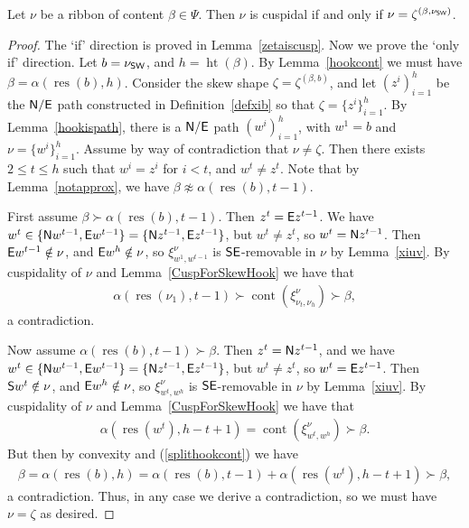 \documentclass[Unicode,ALCO]{cedram}
\newcommand{\res}{\operatorname{res}}
\newcommand{\height}{\operatorname{ht}}
\newcommand{\0}{{\bar 0}}
\newcommand{\so}{{\sf S}}
\newcommand{\no}{{\sf N}}
\newcommand{\ea}{{\sf E}}
\newcommand{\ssee}{{\sf SE}}
\newcommand{\ssww}{{\sf SW}}
\def\cont{{\operatorname{cont}}}
\def\height{{\operatorname{ht}}}
\def\height{{\operatorname{ht}}}
\begin{document}
\begin{lemma}\label{onlycuspribbon}
Let \(\nu\) be a ribbon of content \(\beta \in \Psi\). Then \(\nu\) is cuspidal if and only if \(\nu = \zeta^{(\beta, \nu_{\ssww})}\).
\end{lemma}
\begin{proof}
The `if' direction is proved in Lemma~\ref{zetaiscusp}. Now we prove the `only if' direction. Let \(b =\nu_{\ssww}\), and \(h = \height(\beta)\). By Lemma~\ref{hookcont} we must have \(\beta = \alpha(\res(b),h)\). Consider the skew shape \(\zeta = \zeta^{(\beta,b)}\), and let \((z^i)_{i=1}^h\) be the \(\no/\ea\) path constructed in Definition~\ref{defxib} so that \(\zeta = \{z^i\}_{i=1}^h\). By Lemma~\ref{hookispath}, there is a \(\no/\ea\) path \((w^i)_{i=1}^h\), with \(w^1 = b\) and \(\nu = \{w^i\}_{i=1}^h\). Assume by way of contradiction that \(\nu \neq \zeta\). Then there exists \(2 \leq t \leq h\) such that \(w^i = z^i\) for \(i<t\), and \(w^t \neq z^t\). Note that by Lemma~\ref{notapprox}, we have \(\beta \not \approx \alpha(\res(b),t-1)\).

First assume \(\beta \succ \alpha(\res(b),t-1)\). Then \(z^t = \ea z^{t-1}\).
We have \(w^t \in \{\no w^{t-1}, \ea w^{t-1}\} = \{\no z^{t-1}, \ea z^{t-1}\}\), but \(w^t \neq z^t\), so \(w^t = \no z^{t-1}\). Then \(\ea w^{t-1} \notin \nu\), and \(\ea w^h \notin \nu\), so \(\xi^\nu_{w^1, w^{t-1}}\) is \(\ssee\)-removable in \(\nu\) by Lemma~\ref{xiuv}. By cuspidality of \(\nu\) and Lemma~\ref{CuspForSkewHook} we have that
\begin{align*}
\alpha(\res(\nu_1), t-1) \succ \cont(\xi^\nu_{\nu_t, \nu_h}) \succ \beta,
\end{align*}
a contradiction.

Now assume \(\alpha(\res(b),t-1) \succ \beta\). Then \(z^t = \no z^{t-1}\), and we have \(w^t \in \{\no w^{t-1}, \ea w^{t-1}\} = \{\no z^{t-1}, \ea z^{t-1}\}\), but \(w^t \neq z^t\), so \(w^t = \ea z^{t-1}\). Then \(\so w^t \notin \nu\), and \(\ea w^h \notin \nu\), so \(\xi^\nu_{w^t, w^h}\) is \(\ssee\)-removable in \(\nu\) by Lemma~\ref{xiuv}. By cuspidality of \(\nu\) and Lemma~\ref{CuspForSkewHook} we have that
\begin{align*}
\alpha(\res(w^t), h-t + 1) = \cont(\xi^\nu_{w^t, w^h}) \succ \beta.
\end{align*}
But then by convexity and (\ref{splithookcont}) we have
\begin{align*}
\beta = \alpha(\res(b), h) =  \alpha(\res(b),t-1) + \alpha(\res(w^t), h-t + 1) \succ \beta,
\end{align*}
a contradiction. Thus, in any case we derive a contradiction, so we must have \(\nu = \zeta\) as desired.
\end{proof}
\end{document}
